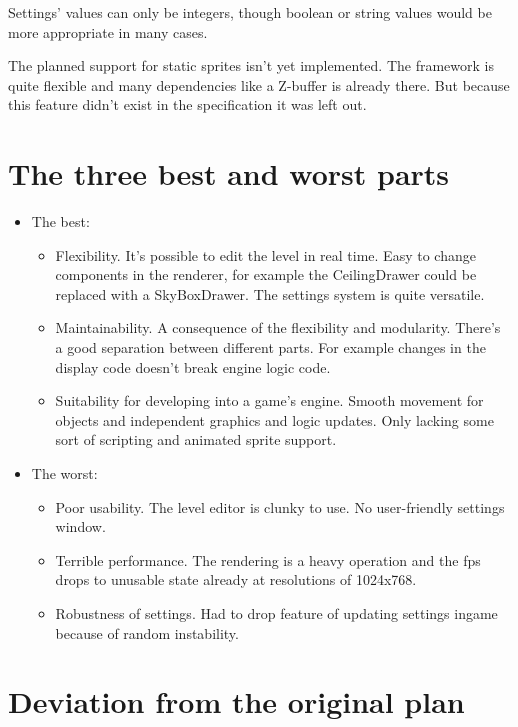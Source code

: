 \documentclass[a4paper,10pt]{article}
\begin{document}
Settings' values can only be integers, though boolean or string values would be
more appropriate in many cases.

The planned support for static sprites isn't yet implemented. The framework is
quite flexible and many dependencies like a Z-buffer is already there. But
because this feature didn't exist in the specification it was left out.

\section{The three best and worst parts}

\begin{itemize}
\item The best:
\begin{itemize}
\item Flexibility. It's possible to edit the level in real time. Easy to change
components in the renderer, for example the CeilingDrawer could be replaced
with a SkyBoxDrawer. The settings system is quite versatile.
\item Maintainability. A consequence of the flexibility and modularity. There's
a good separation between different parts. For example changes in the display
code doesn't break engine logic code.
\item Suitability for developing into a game's engine. Smooth movement for
objects and independent graphics and logic updates. Only lacking some sort of
scripting and animated sprite support.
\end{itemize}

\item The worst:
\begin{itemize}
\item Poor usability. The level editor is clunky to use. No user-friendly
settings window.
\item Terrible performance. The rendering is a heavy operation and the fps drops
to unusable state already at resolutions of 1024x768.
\item Robustness of settings. Had to drop feature of updating settings ingame
because of random instability.
\end{itemize}
\end{itemize}

\section{Deviation from the original plan}
\end{document}

